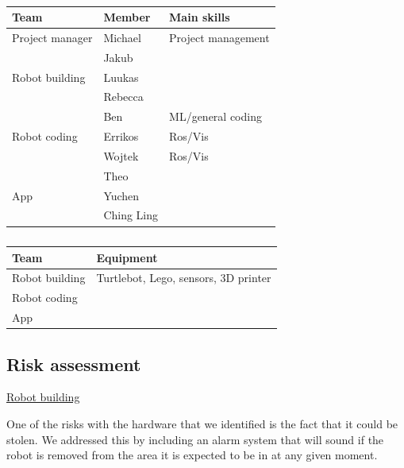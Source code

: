 \documentclass{article}
\begin{document}
\begin{table}[]
  \begin{tabular}{|l|l|l|}
    \hline
    {\bf Team}           & {\bf Member}& {\bf Main skills} \\ \hline
    Project manager      & Michael     & Project management \\ \hline
                         & Jakub       & \\ \cline{2-3}
    Robot building       & Luukas      & \\ \cline{2-3}
                         & Rebecca     & \\ \hline
                         & Ben         & ML/general coding\\ \cline{2-3}
    Robot coding         & Errikos     & Ros/Vis \\ \cline{2-3}
                         & Wojtek      & Ros/Vis \\ \hline
                         & Theo        & \\ \cline{2-3}
    App                  & Yuchen      & \\ \cline{2-3}
                         & Ching Ling  & \\ \hline
  \end{tabular}
  \caption{}
\end{table}

\begin{table}[]
  \begin{tabular}{|l|l|}
    \hline
    {\bf Team}           & {\bf Equipment} \\ \hline
    Robot building       & Turtlebot, Lego, sensors, 3D printer\\ \hline
    Robot coding         & \\ \hline
    App                  & \\ \hline
  \end{tabular}
  \caption{}
\end{table}

\subsection{Risk assessment} 

\underline{Robot building}

One of the risks with the hardware that we identified is the fact that it could be stolen. We addressed this by including an alarm system that will sound if the robot is removed from the area it is expected to be in at any given moment.
\end{document}
